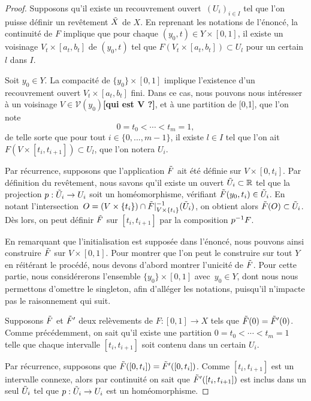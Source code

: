 \begin{proof}
Supposons qu'il existe un recouvrement ouvert~$(U_i)_{i\in I}$ tel que l'on puisse définir un revêtement $\Tilde{X}$ de $X$. En reprenant les notations de l'énoncé, la continuité de $F$ implique que pour chaque $(y_0,t)\in Y\times[0,1]$, il existe un voisinage $V_t\times[a_t,b_t]$ de $(y_0,t)$ tel que $F(V_t\times[a_t,b_t])\subset U_l$ pour un certain $l$ dans $I$.

Soit $y_0\in Y$. La compacité de $\{y_0\}\times[0,1]$ implique l'existence d'un recouvrement ouvert $V_t\times[a_t,b_t]$ fini. Dans ce cas, nous pouvons nous intéresser à un voisinage $V\in\mathcal{V}(y_0)$\textbf{[qui est V ?]}, et à une partition de [0,1], que l'on note $$0=t_0<\cdots<t_m=1,$$de telle sorte que  pour tout $i\in\{0,..., m-1\}$, il existe $l\in I$ tel que l'on ait~$F(V\times[t_i,t_{i+1}])\subset U_l$, que l'on notera $U_i$.

\bigskip Par récurrence, supposons que l'application $\Tilde{F}$ ait été définie sur $V\times[0,t_i]$. Par définition du revêtement, nous savons qu'il existe un ouvert $\Tilde{U}_i\subset\mathbb{R}$ tel que la projection $p:\Tilde{U}_i\to U_i$ soit un homéomorphisme, vérifiant $\Tilde{F}(y_0,t_i)\in\Tilde{U}_i$. En notant l'intersection~$O=(V\times\{t_i\})\cap\Tilde{F}|_{V\times\{t_i\}}^{-1}(\Tilde{U}_i)$, on obtient alors $\Tilde{F}(O)\subset\Tilde{U}_i$. Dès lors, on peut définir $\Tilde{F}$ sur $[t_i,t_{i+1}]$ par la composition $p^{-1} F$.

\bigskip En remarquant que l'initialisation est supposée dans l'énoncé, nous pouvons ainsi construire $\Tilde{F}$ sur $V\times[0,1]$. Pour montrer que l'on peut le construire sur tout $Y$ en réitérant le procédé, nous devons d'abord montrer l'unicité de $\Tilde{F}$. Pour cette partie, nous considérerons l'ensemble $\{y_0\}\times[0,1]$ avec~$y_0\in Y$, dont nous nous permettons d'omettre le singleton, afin d'alléger les notations, puisqu'il n'impacte pas le raisonnement qui suit.

\bigskip Supposons $\Tilde{F}$ et $\Tilde{F}'$ deux relèvements de $F:[0,1]\to X$ tels que $\Tilde{F}(0)=\Tilde{F}'(0)$. Comme précédemment, on sait qu'il existe une partition $0=t_0<\cdots<t_m=1$ telle que chaque intervalle $[t_i,t_{i+1}]$ soit contenu dans un certain $U_i$.

Par récurrence, supposons que $\Tilde{F}([0,t_i])=\Tilde{F}'([0,t_i])$. Comme $[t_i,t_{i+1}]$ est un intervalle connexe, alors par continuité on sait que $\Tilde{F}'([t_i,t_{i+1}])$ est inclus dans un seul $\Tilde{U}_i$ tel que $p:\Tilde{U}_i\to U_i$ est un homéomorphisme.


\end{proof}
